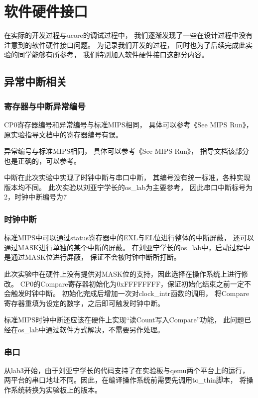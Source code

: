 \section{软件硬件接口}
    在实际的开发过程与ucore的调试过程中，
    我们逐渐发现了一些在设计过程中没有注意到的软件硬件接口问题。
    为记录我们开发的过程，
    同时也为了后续完成此实验的同学能够有所参考，
    我们特别加入软件硬件接口这部分内容。

    \subsection{异常中断相关}
        \subsubsection{寄存器与中断异常编号}
            CP0寄存器编号和异常编号与标准MIPS相同，
            具体可以参考《See MIPS Run》，
            原实验指导文档中的寄存器编号有误。

            异常编号与标准MIPS相同，
            具体可以参考《See MIPS Run》，
            指导文档该部分也是正确的，可以参考。

            中断在此次实验中实现了时钟中断与串口中断，
            其编号没有统一标准，各种实现版本均不同。
            此次实验以刘亚宁学长的os\_lab为主要参考，
            因此串口中断标号为2，时钟中断编号为7

        \subsubsection{时钟中断}
            标准MIPS中可以通过status寄存器中的EXL与EL位进行整体的中断屏蔽，
            还可以通过MASK进行单独的某个中断的屏蔽。
            在刘亚宁学长的os\_lab中，启动过程中是通过MASK位进行屏蔽，
            保证不会被时钟中断所打断。

            此次实验中在硬件上没有提供对MASK位的支持，因此选择在操作系统上进行修改。
            CP0的Compare寄存器初始化为0xFFFFFFFF，保证初始化结束之前一定不会触发时钟中断。
            初始化完成后增加一次对clock\_intr函数的调用，
            将Compare寄存器重填为设定的数字，之后即可触发时钟中断。

            标准MIPS时钟中断还应该在硬件上实现“读Count写入Compare”功能，
            此问题已经在os\_lab中通过软件方式解决，不需要另作处理。

        \subsubsection{串口}
            从lab3开始，由于刘亚宁学长的代码支持了在实验板与qemu两个平台上的运行，
            两平台的串口地址不同。因此，在编译操作系统前需要先调用to\_thin脚本，
            将操作系统转换为实验板上的版本。

